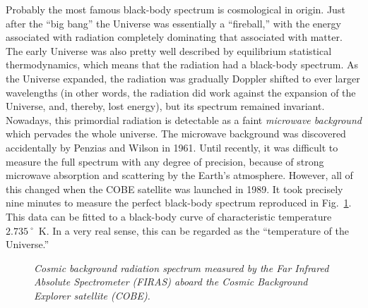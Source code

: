 Probably the most famous black-body spectrum is cosmological in origin. Just after
the ``big bang'' the Universe was essentially a ``fireball,'' with the energy associated with
radiation completely dominating that associated with
matter. The early Universe was also pretty
well described by equilibrium statistical thermodynamics,
which means that the radiation had a black-body spectrum. As the Universe expanded,
the radiation was gradually Doppler shifted to ever larger wavelengths (in other
words, the radiation did work against the expansion of the Universe, and, thereby,
lost energy), but its spectrum remained invariant. Nowadays, this primordial
radiation is detectable as a faint {\em microwave background}\/ which pervades the
whole universe. The microwave background was discovered accidentally by Penzias
and Wilson in 1961. Until recently, it was difficult to measure the full
spectrum with any degree of
precision, because of strong microwave absorption and scattering by
the Earth's atmosphere. However, all of this changed  when the COBE satellite
was launched in 1989. It took precisely nine minutes to measure the perfect
black-body spectrum reproduced in Fig.~\ref{fbb}.
 This data can be fitted to a black-body
curve of characteristic
temperature $2.735~^\circ$~K. In a very real sense, this can be regarded
as the ``temperature of the Universe.''

\begin{figure}
\epsfysize=3in
\centerline{}
\caption{\em Cosmic background radiation spectrum measured by the
Far Infrared Absolute Spectrometer (FIRAS) aboard the Cosmic Background
Explorer satellite (COBE).}\label{fbb}
\end{figure}

